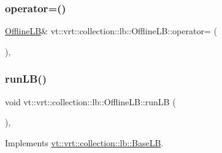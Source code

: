 \mbox{\label{structvt_1_1vrt_1_1collection_1_1lb_1_1_offline_l_b_a2d6408b68d2f1eb5b59d78715e0915d5}} 
\subsubsection{\texorpdfstring{operator=()}{operator=()}\hspace{0.1cm}{\footnotesize\ttfamily [2/2]}}
{\footnotesize\ttfamily \hyperlink{structvt_1_1vrt_1_1collection_1_1lb_1_1_offline_l_b}{Offline\+LB}\& vt\+::vrt\+::collection\+::lb\+::\+Offline\+L\+B\+::operator= (\begin{DoxyParamCaption}\item[{\hyperlink{structvt_1_1vrt_1_1collection_1_1lb_1_1_offline_l_b}{Offline\+LB} \&\&}]{ }\end{DoxyParamCaption})\hspace{0.3cm}{\ttfamily [default]}, {\ttfamily [noexcept]}}

\mbox{\label{structvt_1_1vrt_1_1collection_1_1lb_1_1_offline_l_b_ad6b473ed506c50b86e308fc9840a11d7}} 
\subsubsection{\texorpdfstring{run\+L\+B()}{runLB()}}
{\footnotesize\ttfamily void vt\+::vrt\+::collection\+::lb\+::\+Offline\+L\+B\+::run\+LB (\begin{DoxyParamCaption}\item[{\hyperlink{namespacevt_a8fb51741340b87d7aaee0bef60e9896b}{Load\+Type}}]{ }\end{DoxyParamCaption})\hspace{0.3cm}{\ttfamily [override]}, {\ttfamily [virtual]}}



Implements \hyperlink{structvt_1_1vrt_1_1collection_1_1lb_1_1_base_l_b_aa957038bb132ac29fb61535487f0604f}{vt\+::vrt\+::collection\+::lb\+::\+Base\+LB}.



